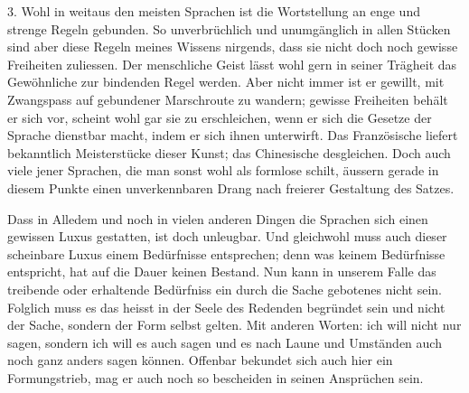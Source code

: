 3. Wohl in weitaus den meisten Sprachen ist die Wortstellung an enge und strenge Regeln gebunden. So unverbrüchlich und unumgänglich in allen Stücken sind aber diese Regeln meines Wissens nirgends, dass sie nicht doch noch gewisse Freiheiten zuliessen. Der menschliche Geist lässt wohl gern in seiner Trägheit das Gewöhnliche zur bindenden Regel werden. Aber nicht immer ist er gewillt, mit Zwangspass auf gebundener Marschroute zu wandern; gewisse Freiheiten behält er sich vor, scheint wohl gar sie zu erschleichen, wenn er sich die Gesetze der Sprache dienstbar macht, indem er sich ihnen unterwirft. Das Französische liefert bekanntlich Meisterstücke dieser Kunst; das Chinesische desgleichen. Doch auch viele jener Sprachen, die man sonst wohl \label{sp.364} als formlose schilt, äussern gerade in diesem Punkte einen unverkennbaren Drang nach freierer Gestaltung des Satzes.

\label{fp.347}

\largerpage
Dass in Alledem und noch in vielen anderen Dingen die Sprachen sich einen gewissen Luxus gestatten, ist doch unleugbar. Und gleichwohl muss auch dieser scheinbare Luxus einem Bedürfnisse entsprechen; denn was keinem Bedürfnisse entspricht, hat auf die Dauer keinen Bestand. Nun kann in unserem Falle das treibende oder erhaltende Bedürfniss ein  durch die Sache gebotenes nicht sein. Folglich muss es  das heisst in der Seele des Redenden begründet sein und nicht der Sache, sondern der Form selbst gelten. Mit anderen Worten: ich will nicht nur  sagen, sondern ich will es auch  sagen und es nach Laune und Umständen auch noch ganz anders sagen können. Offenbar bekundet sich auch hier ein Formungstrieb, mag er auch noch so bescheiden in seinen Ansprüchen sein.

